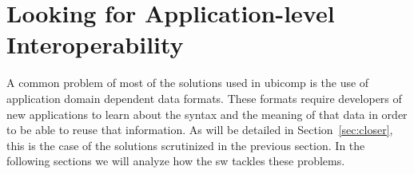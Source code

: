 \section{Looking for Application-level Interoperability}
\label{sec:interoperability}

A common problem of most of the solutions used in \ac{ubicomp} is the use of application domain dependent data formats.
These formats require developers of new applications to learn about the syntax and the meaning of that data in order to be able to reuse that information.
As will be detailed in Section~\ref{sec:closer}, this is the case of the solutions scrutinized in the previous section.
In the following sections we will analyze how the \acl{sw} tackles these problems.





